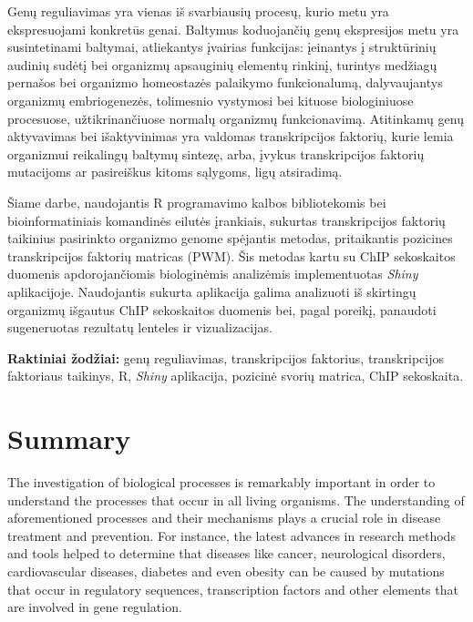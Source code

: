 \documentclass[12pt]{article}
\begin{document}
Genų reguliavimas yra vienas iš svarbiausių procesų, kurio metu yra
ekspresuojami konkretūs genai. Baltymus koduojančių genų ekspresijos metu yra
susintetinami baltymai, atliekantys įvairias funkcijas: įeinantys į struktūrinių
audinių sudėtį bei organizmų apsauginių elementų rinkinį, turintys medžiagų
pernašos bei organizmo homeostazės palaikymo funkcionalumą, dalyvaujantys
organizmų embriogenezės, tolimesnio vystymosi bei kituose biologiniuose
procesuose, užtikrinančiuose normalų organizmų funkcionavimą. Atitinkamų genų
aktyvavimas bei išaktyvinimas yra valdomas transkripcijos faktorių, kurie lemia
organizmui reikalingų baltymų sintezę, arba, įvykus transkripcijos faktorių
mutacijoms ar pasireiškus kitoms sąlygoms, ligų atsiradimą.

Šiame darbe, naudojantis R programavimo kalbos bibliotekomis bei
bioinformatiniais komandinės eilutės įrankiais, sukurtas transkripcijos faktorių
taikinius pasirinkto organizmo genome spėjantis metodas, pritaikantis pozicines
transkripcijos faktorių matricas (PWM). Šis metodas kartu su ChIP sekoskaitos
duomenis apdorojančiomis biologinėmis analizėmis implementuotas \emph{Shiny}
aplikacijoje. Naudojantis sukurta aplikacija galima analizuoti iš skirtingų
organizmų išgautus ChIP sekoskaitos duomenis bei, pagal poreikį, panaudoti
sugeneruotas rezultatų lenteles ir vizualizacijas.

\hfill \break
\textbf{Raktiniai žodžiai:} genų reguliavimas, transkripcijos faktorius, 
transkripcijos faktoriaus taikinys, R, \emph{Shiny} aplikacija, pozicinė svorių
matrica, ChIP sekoskaita.

\newpage


\section*{Summary}
The investigation of biological processes is remarkably important in order to
understand the processes that occur in all living organisms. The understanding
of aforementioned processes and their mechanisms plays a crucial role in
disease treatment and prevention. For instance, the latest advances in research
methods and tools helped to determine that diseases like cancer, neurological
disorders, cardiovascular diseases, diabetes and even obesity can be caused
by mutations that occur in regulatory sequences, transcription factors and
other elements that are involved in gene regulation.
\end{document}
